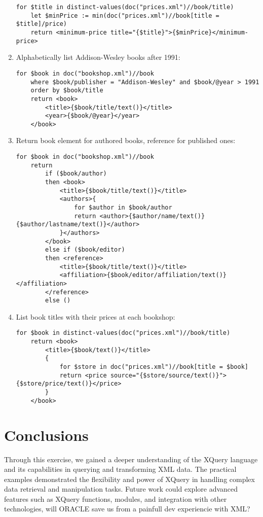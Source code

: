 \documentclass[twoside]{article}
\begin{document}
\begin{enumerate}
    \begin{lstlisting}[style=xquery]
    for $title in distinct-values(doc("prices.xml")//book/title)
    let $minPrice := min(doc("prices.xml")//book[title = $title]/price)
    return <minimum-price title="{$title}">{$minPrice}</minimum-price>
    \end{lstlisting}
    \item Alphabetically list Addison-Wesley books after 1991:
    \begin{lstlisting}[style=xquery]
    for $book in doc("bookshop.xml")//book
    where $book/publisher = "Addison-Wesley" and $book/@year > 1991
    order by $book/title
    return <book>
        <title>{$book/title/text()}</title>
        <year>{$book/@year}</year>
    </book>
    \end{lstlisting}
    \item Return book element for authored books, reference for published ones:
    \begin{lstlisting}[style=xquery]
    for $book in doc("bookshop.xml")//book
    return
        if ($book/author)
        then <book>
            <title>{$book/title/text()}</title>
            <authors>{
                for $author in $book/author
                return <author>{$author/name/text()} {$author/lastname/text()}</author>
            }</authors>
        </book>
        else if ($book/editor)
        then <reference>
            <title>{$book/title/text()}</title>
            <affiliation>{$book/editor/affiliation/text()}</affiliation>
        </reference>
        else ()
    \end{lstlisting}
    \item List book titles with their prices at each bookshop:
    \begin{lstlisting}[style=xquery]
    for $book in distinct-values(doc("prices.xml")//book/title)
    return <book>
        <title>{$book/text()}</title>
        {
            for $store in doc("prices.xml")//book[title = $book]
            return <price source="{$store/source/text()}">{$store/price/text()}</price>
        }
    </book>
    \end{lstlisting}
\end{enumerate}
\section{Conclusions}
Through this exercise, we gained a deeper understanding of the XQuery language and its capabilities in querying and transforming XML data. The practical examples demonstrated the flexibility and power of XQuery in handling complex data retrieval and manipulation tasks. Future work could explore advanced features such as XQuery functions, modules, and integration with other technologies, will ORACLE save us from a painfull dev experiencie with XML?
\end{document}
